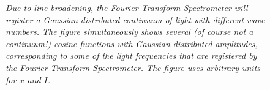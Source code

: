\documentclass[a4paper]{article}
\begin{document}
\begin{figure}[htb!]

\label{cos}

\begin{center}


\end{center}

\caption{\textit{Due to line broadening, the Fourier Transform Spectrometer will register a Gaussian-distributed continuum of light with different wave numbers. The figure simultaneously shows several (of course not a continuum!) cosine functions with Gaussian-distributed amplitudes, corresponding to some of the light frequencies that are registered by the Fourier Transform Spectrometer. The figure uses arbitrary units for $x$ and $I$.}}

\end{figure}
\end{document}
